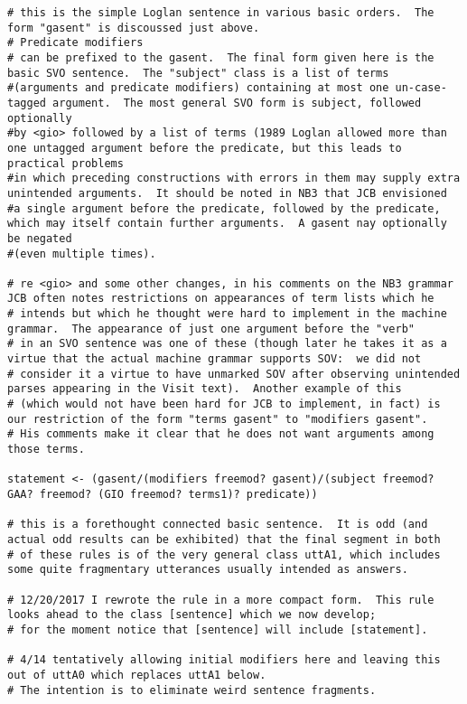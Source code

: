 \documentclass{article}
\begin{document}
\begin{verbatim}
# this is the simple Loglan sentence in various basic orders.  The form "gasent" is discoussed just above.  
# Predicate modifiers
# can be prefixed to the gasent.  The final form given here is the basic SVO sentence.  The "subject" class is a list of terms
#(arguments and predicate modifiers) containing at most one un-case-tagged argument.  The most general SVO form is subject, followed optionally
#by <gio> followed by a list of terms (1989 Loglan allowed more than one untagged argument before the predicate, but this leads to practical problems
#in which preceding constructions with errors in them may supply extra unintended arguments.  It should be noted in NB3 that JCB envisioned
#a single argument before the predicate, followed by the predicate, which may itself contain further arguments.  A gasent nay optionally be negated
#(even multiple times).

# re <gio> and some other changes, in his comments on the NB3 grammar  JCB often notes restrictions on appearances of term lists which he
# intends but which he thought were hard to implement in the machine grammar.  The appearance of just one argument before the "verb"
# in an SVO sentence was one of these (though later he takes it as a virtue that the actual machine grammar supports SOV:  we did not
# consider it a virtue to have unmarked SOV after observing unintended parses appearing in the Visit text).  Another example of this
# (which would not have been hard for JCB to implement, in fact) is our restriction of the form "terms gasent" to "modifiers gasent".
# His comments make it clear that he does not want arguments among those terms.

statement <- (gasent/(modifiers freemod? gasent)/(subject freemod? GAA? freemod? (GIO freemod? terms1)? predicate))

# this is a forethought connected basic sentence.  It is odd (and actual odd results can be exhibited) that the final segment in both
# of these rules is of the very general class uttA1, which includes some quite fragmentary utterances usually intended as answers.

# 12/20/2017 I rewrote the rule in a more compact form.  This rule looks ahead to the class [sentence] which we now develop;
# for the moment notice that [sentence] will include [statement].

# 4/14 tentatively allowing initial modifiers here and leaving this out of uttA0 which replaces uttA1 below.
# The intention is to eliminate weird sentence fragments.


\end{verbatim}
\end{document}
